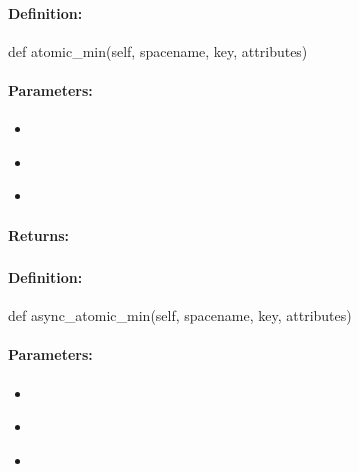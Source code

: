 \paragraph{Definition:}
\begin{pythoncode}
def atomic_min(self, spacename, key, attributes)
\end{pythoncode}

\paragraph{Parameters:}
\begin{itemize}[noitemsep]
\item {}\\

\item {}\\

\item {}\\

\end{itemize}

\paragraph{Returns:}


\pagebreak
\subsubsection{}
\label{api:python:async_atomic_min}


\paragraph{Definition:}
\begin{pythoncode}
def async_atomic_min(self, spacename, key, attributes)
\end{pythoncode}

\paragraph{Parameters:}
\begin{itemize}[noitemsep]
\item {}\\

\item {}\\

\item {}\\

\end{itemize}

